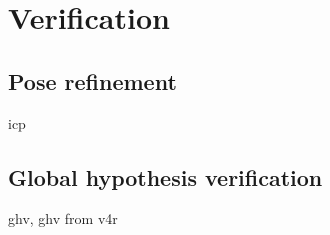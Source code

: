 
\chapter{Verification}
\label{cha:verification}


\section{Pose refinement}
\label{sec:icp}

icp


\section{Global hypothesis verification}
\label{sec:ghv}

ghv, ghv from v4r